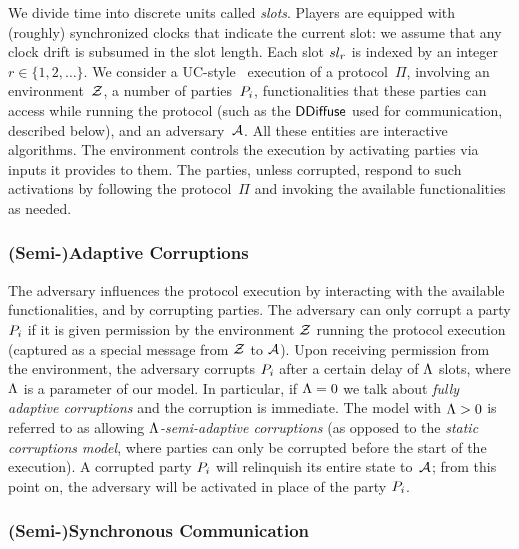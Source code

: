 We divide time into discrete units called
\emph{slots}. %
Players are equipped with (roughly) synchronized clocks that
indicate the current slot: we assume that any clock drift is subsumed in the
slot length.  Each slot $sl_r$ is indexed by an integer $r \in \{1,2,\ldots
\}$.
We consider a UC-style~\cite{uc} execution of a protocol~$\Pi$,
involving an environment~$\mathcal{Z}$, a number of
parties~$P_i$, functionalities that these parties can access while running
the protocol (such as the $\mathsf{DDiffuse}$ used for communication, described below), and
an adversary~$\mathcal{A}$. All these entities are interactive algorithms.  The
environment controls the execution by activating parties via inputs it provides
to them. The parties, unless corrupted, respond to such activations by following
the protocol~$\Pi$ and invoking the available functionalities as needed.

\subsubsection{(Semi-)Adaptive Corruptions}
\label{sec:prelim-corr}

The adversary  influences the protocol execution by interacting
with the available functionalities, and by corrupting parties.
The adversary can only corrupt a party $P_i$ if it is given
permission by the environment $\mathcal{Z}$ running the protocol execution (captured as
a special message from $\mathcal{Z}$ to $\mathcal{A}$).
Upon receiving permission from the environment, the adversary
corrupts $P_i$ after a certain delay of $\Lambda$ slots, where $\Lambda$ is
a parameter of our model. In particular, if $\Lambda=0$ we talk about
\emph{fully adaptive corruptions} and the corruption is immediate.
The model with $\Lambda>0$ is
referred to as allowing \emph{$\Lambda$-semi-adaptive corruptions} (as opposed to the
\emph{static corruptions model}, where parties can only be corrupted before the
start of the execution).
%
A corrupted
party $P_i$ will relinquish its entire state to~$\mathcal{A}$;
from this point on, the adversary will be activated in place of the
party $P_i$.

\subsubsection{(Semi-)Synchronous Communication}
\label{sec:prelim-comm}

